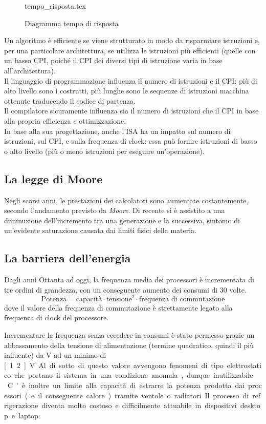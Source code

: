\documentclass[class=book, crop=false]{standalone}
\begin{document}
\begin{figure}[H]
	\centering
	{tempo_risposta.tex}
	\caption{Diagramma tempo di risposta}
\end{figure}

Un algoritmo è efficiente se viene strutturato in modo da risparmiare istruzioni e, per una particolare architettura, se utilizza le istruzioni più efficienti (quelle con un basso CPI, poiché il CPI dei diversi tipi di istruzione varia in base all'architettura).\\
Il linguaggio di programmazione influenza il numero di istruzioni e il CPI: più di alto livello sono i costrutti, più lunghe sono le sequenze di istruzioni macchina ottenute traducendo il codice di partenza.\\
Il compilatore sicuramente influenza sia il numero di istruzioni che il CPI in base alla propria efficienza e ottimizzazione.\\
In base alla sua progettazione, anche l'ISA ha un impatto sul numero di istruzioni, sul CPI, e sulla frequenza di clock: essa può fornire istruzioni di basso o alto livello (più o meno istruzioni per eseguire un'operazione).

\subsection{La legge di Moore}
Negli scorsi anni, le prestazioni dei calcolatori sono aumentate costantemente, secondo l'andamento previsto da \emph{Moore}. Di recente si è assistito a una diminuzione dell’incremento tra una generazione e la successiva, sintomo di un'evidente saturazione causata dai limiti fisici della materia.

\subsection{La barriera dell'energia}
Dagli anni Ottanta ad oggi, la frequenza media dei processori è incrementata di tre ordini di grandezza, con un conseguente aumento dei consumi di 30 volte.
\begin{equation*}
\text{Potenza} = \text{capacità}\cdot \text{tensione}^2\cdot \text{frequenza di commutazione}
\end{equation*}
dove il valore della frequenza di commutazione è strettamente legato alla frequenza di clock del processore.

Incrementare la frequenza senza eccedere in consumi è stato permesso grazie un abbassamento della tensione di alimentazione (termine quadratico, quindi il più influente) da \unit[5]{V} ad un minimo di \unit[1.2]{V}. Al di sotto di questo valore avvengono fenomeni di tipo elettrostatico che portano il sistema in una condizione anomala, dunque inutilizzabile.\\
C'è inoltre un limite alla capacità di estrarre la potenza prodotta dai processori (e il conseguente calore) tramite ventole o radiatori. Il processo di refrigerazione diventa molto costoso e difficilmente attuabile in dispositivi desktop e laptop.
\end{document}

